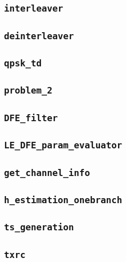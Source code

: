 \documentclass[10pt]{article}
\numberwithin{equation}{section}
\begin{document}
\subsection*{\texttt{interleaver}}


\subsection*{\texttt{deinterleaver}}


\subsection*{\texttt{qpsk\_td}}


\subsection*{\texttt{problem\_2}}


\subsection*{\texttt{DFE\_filter}}


\subsection*{\texttt{LE\_DFE\_param\_evaluator}}


\subsection*{\texttt{get\_channel\_info}}


\pagebreak

\subsection*{\texttt{h\_estimation\_onebranch}}


\subsection*{\texttt{ts\_generation}}


\subsection*{\texttt{txrc}}

\end{document}
